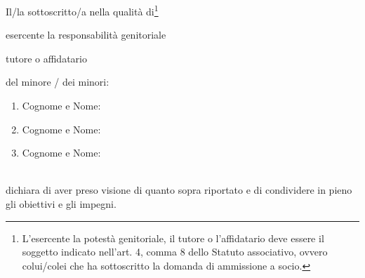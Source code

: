 \documentclass{djtsmod}
\begin{document}
	Il/la sottoscritto/a \fieldfill\; nella qualità di\footnote{L'esercente la potestà genitoriale, il tutore o l'affidatario deve essere il soggetto indicato nell'art. 4, comma 8 dello Statuto associativo, ovvero colui/colei che ha sottoscritto la domanda di ammissione a socio.}
	\begin{radiolist}
		\item esercente la responsabilità genitoriale  
		\item tutore o affidatario
	\end{radiolist}
	del minore / dei minori: \\
	\begin{minipage}{0.8\textwidth}
		\begin{enumerate}
			\item Cognome e Nome: \fieldfill
			\item Cognome e Nome: \fieldfill
			\item Cognome e Nome: \fieldfill
		\end{enumerate}
	\end{minipage}\\[20pt]
	dichiara di aver preso visione di quanto sopra riportato e di condividere in pieno gli obiettivi e gli impegni.
	
	\vspace{0.5in}
	
\end{document}
